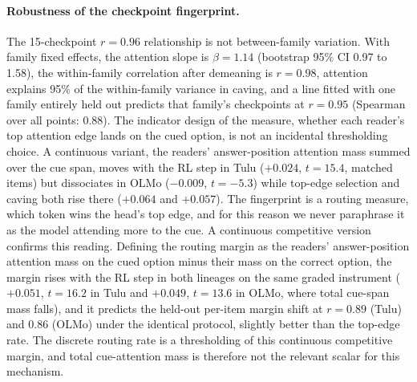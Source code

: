 \documentclass{article}
\begin{document}
\paragraph{Robustness of the checkpoint fingerprint.} The 15-checkpoint $r=0.96$ relationship is not between-family variation. With family fixed effects, the attention slope is $\beta = 1.14$ (bootstrap 95\% CI 0.97 to 1.58), the within-family correlation after demeaning is $r=0.98$, attention explains 95\% of the within-family variance in caving, and a line fitted with one family entirely held out predicts that family's checkpoints at $r=0.95$ (Spearman over all points: 0.88). The indicator design of the measure, whether each reader's top attention edge lands on the cued option, is not an incidental thresholding choice. A continuous variant, the readers' answer-position attention mass summed over the cue span, moves with the RL step in Tulu ($+0.024$, $t=15.4$, matched items) but dissociates in OLMo ($-0.009$, $t=-5.3$) while top-edge selection and caving both rise there ($+0.064$ and $+0.057$). The fingerprint is a routing measure, which token wins the head's top edge, and for this reason we never paraphrase it as the model attending more to the cue. A continuous competitive version confirms this reading. Defining the routing margin as the readers' answer-position attention mass on the cued option minus their mass on the correct option, the margin rises with the RL step in both lineages on the same graded instrument ($+0.051$, $t=16.2$ in Tulu and $+0.049$, $t=13.6$ in OLMo, where total cue-span mass falls), and it predicts the held-out per-item margin shift at $r=0.89$ (Tulu) and $0.86$ (OLMo) under the identical protocol, slightly better than the top-edge rate. The discrete routing rate is a thresholding of this continuous competitive margin, and total cue-attention mass is therefore not the relevant scalar for this mechanism.
\end{document}
